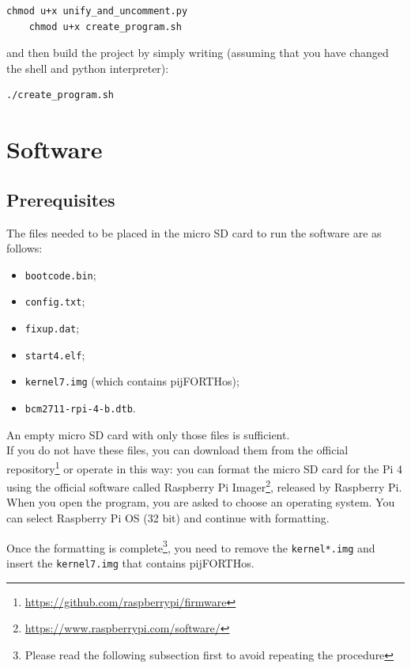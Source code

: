 \documentclass[a4paper, 12pt]{article}
\begin{document}
\begin{Verbatim}[breaklines=true, breakanywhere=true]
    chmod u+x unify_and_uncomment.py
    chmod u+x create_program.sh
\end{Verbatim}

and then build the project by simply writing (assuming that you have changed the shell and python interpreter):

\begin{Verbatim}[breaklines=true, breakanywhere=true]
    ./create_program.sh
\end{Verbatim}
\section{Software}

\subsection{Prerequisites}

The files needed to be placed in the micro SD card to run the software are as follows:
\begin{itemize}
    \item \texttt{bootcode.bin};
    \item \texttt{config.txt};
    \item \texttt{fixup.dat};
    \item \texttt{start4.elf};
    \item \texttt{kernel7.img} (which contains pijFORTHos);
    \item \texttt{bcm2711-rpi-4-b.dtb}.
\end{itemize}

An empty micro SD card with only those files is sufficient. \\ 
If you do not have these files, you can download them from the official repository\footnote{\url{https://github.com/raspberrypi/firmware}} or operate in this way: you can format the micro SD card for the Pi 4 using the official software called Raspberry Pi Imager\footnote{\url{https://www.raspberrypi.com/software/}}, released by Raspberry Pi. \\
When you open the program, you are asked to choose an operating system. You can select Raspberry Pi OS (32 bit) and continue with formatting.

Once the formatting is complete\footnote{Please read the following subsection first to avoid repeating the procedure}, you need to remove the \texttt{kernel*.img} and insert the \texttt{kernel7.img} that contains pijFORTHos.
\end{document}

